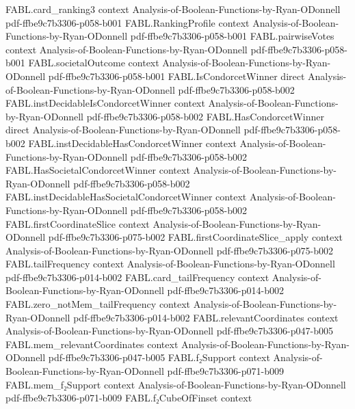 \begin{theorem}
  {FABL.card_ranking3}
  {context}
  {Analysis-of-Boolean-Functions-by-Ryan-ODonnell}
  {pdf-ffbe9c7b3306-p058-b001}
\proofstep
  {FABL.RankingProfile}
  {context}
  {Analysis-of-Boolean-Functions-by-Ryan-ODonnell}
  {pdf-ffbe9c7b3306-p058-b001}
\proofstep
  {FABL.pairwiseVotes}
  {context}
  {Analysis-of-Boolean-Functions-by-Ryan-ODonnell}
  {pdf-ffbe9c7b3306-p058-b001}
\proofstep
  {FABL.societalOutcome}
  {context}
  {Analysis-of-Boolean-Functions-by-Ryan-ODonnell}
  {pdf-ffbe9c7b3306-p058-b001}
\proofstep
  {FABL.IsCondorcetWinner}
  {direct}
  {Analysis-of-Boolean-Functions-by-Ryan-ODonnell}
  {pdf-ffbe9c7b3306-p058-b002}
\proofstep
  {FABL.instDecidableIsCondorcetWinner}
  {context}
  {Analysis-of-Boolean-Functions-by-Ryan-ODonnell}
  {pdf-ffbe9c7b3306-p058-b002}
\proofstep
  {FABL.HasCondorcetWinner}
  {direct}
  {Analysis-of-Boolean-Functions-by-Ryan-ODonnell}
  {pdf-ffbe9c7b3306-p058-b002}
\proofstep
  {FABL.instDecidableHasCondorcetWinner}
  {context}
  {Analysis-of-Boolean-Functions-by-Ryan-ODonnell}
  {pdf-ffbe9c7b3306-p058-b002}
\proofstep
  {FABL.HasSocietalCondorcetWinner}
  {context}
  {Analysis-of-Boolean-Functions-by-Ryan-ODonnell}
  {pdf-ffbe9c7b3306-p058-b002}
\proofstep
  {FABL.instDecidableHasSocietalCondorcetWinner}
  {context}
  {Analysis-of-Boolean-Functions-by-Ryan-ODonnell}
  {pdf-ffbe9c7b3306-p058-b002}
\proofstep
  {FABL.firstCoordinateSlice}
  {context}
  {Analysis-of-Boolean-Functions-by-Ryan-ODonnell}
  {pdf-ffbe9c7b3306-p075-b002}
\proofstep
  {FABL.firstCoordinateSlice_apply}
  {context}
  {Analysis-of-Boolean-Functions-by-Ryan-ODonnell}
  {pdf-ffbe9c7b3306-p075-b002}
\proofstep
  {FABL.tailFrequency}
  {context}
  {Analysis-of-Boolean-Functions-by-Ryan-ODonnell}
  {pdf-ffbe9c7b3306-p014-b002}
\proofstep
  {FABL.card_tailFrequency}
  {context}
  {Analysis-of-Boolean-Functions-by-Ryan-ODonnell}
  {pdf-ffbe9c7b3306-p014-b002}
\proofstep
  {FABL.zero_notMem_tailFrequency}
  {context}
  {Analysis-of-Boolean-Functions-by-Ryan-ODonnell}
  {pdf-ffbe9c7b3306-p014-b002}
\proofstep
  {FABL.relevantCoordinates}
  {context}
  {Analysis-of-Boolean-Functions-by-Ryan-ODonnell}
  {pdf-ffbe9c7b3306-p047-b005}
\proofstep
  {FABL.mem_relevantCoordinates}
  {context}
  {Analysis-of-Boolean-Functions-by-Ryan-ODonnell}
  {pdf-ffbe9c7b3306-p047-b005}
\proofstep
  {FABL.f₂Support}
  {context}
  {Analysis-of-Boolean-Functions-by-Ryan-ODonnell}
  {pdf-ffbe9c7b3306-p071-b009}
\proofstep
  {FABL.mem_f₂Support}
  {context}
  {Analysis-of-Boolean-Functions-by-Ryan-ODonnell}
  {pdf-ffbe9c7b3306-p071-b009}
\proofstep
  {FABL.f₂CubeOfFinset}
  {context}

\end{theorem}
